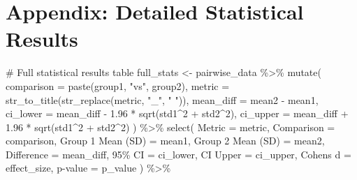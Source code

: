 \documentclass[
  11pt,
]{article}
\newenvironment{Shaded}{\begin{snugshade}}{\end{snugshade}}
\newcommand{\AttributeTok}[1]{\textcolor[rgb]{0.40,0.45,0.13}{#1}}
\newcommand{\CommentTok}[1]{\textcolor[rgb]{0.37,0.37,0.37}{#1}}
\newcommand{\DecValTok}[1]{\textcolor[rgb]{0.68,0.00,0.00}{#1}}
\newcommand{\FloatTok}[1]{\textcolor[rgb]{0.68,0.00,0.00}{#1}}
\newcommand{\FunctionTok}[1]{\textcolor[rgb]{0.28,0.35,0.67}{#1}}
\newcommand{\NormalTok}[1]{\textcolor[rgb]{0.00,0.23,0.31}{#1}}
\newcommand{\OtherTok}[1]{\textcolor[rgb]{0.00,0.23,0.31}{#1}}
\newcommand{\SpecialCharTok}[1]{\textcolor[rgb]{0.37,0.37,0.37}{#1}}
\newcommand{\StringTok}[1]{\textcolor[rgb]{0.13,0.47,0.30}{#1}}
\begin{document}
\section{Appendix: Detailed Statistical
Results}\label{appendix-detailed-statistical-results}

\begin{Shaded}
\begin{Highlighting}[]
\CommentTok{\# Full statistical results table}
\NormalTok{full\_stats }\OtherTok{\textless{}{-}}\NormalTok{ pairwise\_data }\SpecialCharTok{\%\textgreater{}\%}
  \FunctionTok{mutate}\NormalTok{(}
    \AttributeTok{comparison =} \FunctionTok{paste}\NormalTok{(group1, }\StringTok{"vs"}\NormalTok{, group2),}
    \AttributeTok{metric =} \FunctionTok{str\_to\_title}\NormalTok{(}\FunctionTok{str\_replace}\NormalTok{(metric, }\StringTok{"\_"}\NormalTok{, }\StringTok{" "}\NormalTok{)),}
    \AttributeTok{mean\_diff =}\NormalTok{ mean2 }\SpecialCharTok{{-}}\NormalTok{ mean1,}
    \AttributeTok{ci\_lower =}\NormalTok{ mean\_diff }\SpecialCharTok{{-}} \FloatTok{1.96} \SpecialCharTok{*} \FunctionTok{sqrt}\NormalTok{(std1}\SpecialCharTok{\^{}}\DecValTok{2} \SpecialCharTok{+}\NormalTok{ std2}\SpecialCharTok{\^{}}\DecValTok{2}\NormalTok{),}
    \AttributeTok{ci\_upper =}\NormalTok{ mean\_diff }\SpecialCharTok{+} \FloatTok{1.96} \SpecialCharTok{*} \FunctionTok{sqrt}\NormalTok{(std1}\SpecialCharTok{\^{}}\DecValTok{2} \SpecialCharTok{+}\NormalTok{ std2}\SpecialCharTok{\^{}}\DecValTok{2}\NormalTok{)}
\NormalTok{  ) }\SpecialCharTok{\%\textgreater{}\%}
  \FunctionTok{select}\NormalTok{(}
    \AttributeTok{Metric =}\NormalTok{ metric,}
    \AttributeTok{Comparison =}\NormalTok{ comparison,}
    \StringTok{\textasciigrave{}}\AttributeTok{Group 1 Mean (SD)}\StringTok{\textasciigrave{}} \OtherTok{=}\NormalTok{ mean1,}
    \StringTok{\textasciigrave{}}\AttributeTok{Group 2 Mean (SD)}\StringTok{\textasciigrave{}} \OtherTok{=}\NormalTok{ mean2,}
    \StringTok{\textasciigrave{}}\AttributeTok{Difference}\StringTok{\textasciigrave{}} \OtherTok{=}\NormalTok{ mean\_diff,}
    \StringTok{\textasciigrave{}}\AttributeTok{95\% CI}\StringTok{\textasciigrave{}} \OtherTok{=}\NormalTok{ ci\_lower,}
    \StringTok{\textasciigrave{}}\AttributeTok{CI Upper}\StringTok{\textasciigrave{}} \OtherTok{=}\NormalTok{ ci\_upper,}
    \StringTok{\textasciigrave{}}\AttributeTok{Cohen\textquotesingle{}s d}\StringTok{\textasciigrave{}} \OtherTok{=}\NormalTok{ effect\_size,}
    \StringTok{\textasciigrave{}}\AttributeTok{p{-}value}\StringTok{\textasciigrave{}} \OtherTok{=}\NormalTok{ p\_value}
\NormalTok{  ) }\SpecialCharTok{\%\textgreater{}\%}

\end{Highlighting}
\end{Shaded}
\end{document}
